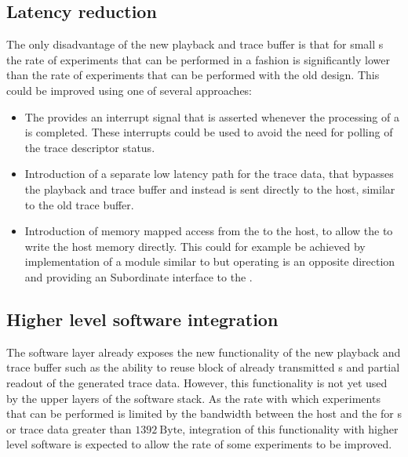 \subsection{Latency reduction}\label{sec:latency_reduction}
The only disadvantage of the new playback and trace buffer is that for small \PlaybackProgram{}s the rate of experiments that can be performed in a \HWinTheLoop{} fashion is significantly lower than the rate of experiments that can be performed with the old design. This could be improved using one of several approaches:
\begin{itemize}
  \item The \AXIDMA{} provides an interrupt signal that is asserted whenever the processing of a \descriptor{} is completed. These interrupts could be used to avoid the need for polling of the trace descriptor status.
  \item Introduction of a separate low latency path for the trace data, that bypasses the playback and trace buffer and instead is sent directly to the host, similar to the old trace buffer.
  \item Introduction of memory mapped access from the \FPGA{} to the host, to allow the \FPGA{} to write the host memory directly. This could for example be achieved by implementation of a module similar to \FAXI{} but operating is an opposite direction and providing an \AXI{} Subordinate interface to the \FPGA{}.
\end{itemize}
\subsection{Higher level software integration}
The \ayo{} software layer already exposes the new functionality of the new playback and trace buffer such as the ability to reuse block of already transmitted \PlaybackProgram{}s and partial readout of the generated trace data. However, this functionality is not yet used by the upper layers of the \BSS{} software stack. As the rate with which experiments that can be performed is limited by the bandwidth between the host and the \FPGA{} for \PlaybackProgram{}s or trace data greater than $\num{1392}~\text{Byte}$, integration of this functionality with higher level software is expected to allow the rate of some experiments to be improved.

